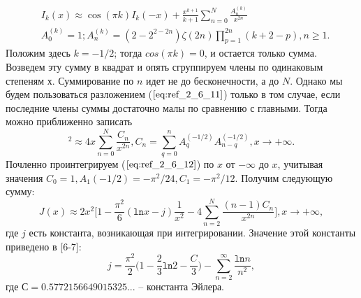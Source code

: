 \begin{equation}
\begin{aligned}
&I_k(x) \approx \cos (\pi k) I_k(-x) + \frac{x^{k+1}}{k+1} \sum\limits_{n=0}^N \frac{A_n^{(k)}}{x^{2n}} \\
&A_0^{(k)} = 1; A_n^{(k)} = (2-2^{2-2n}) \zeta(2n) \prod\limits_{p=1}^{2n} (k+2-p), n \geqslant 1.
\end{aligned}
\label{eq:ref_2_6_11}
\end{equation}
Положим здесь $k = -1/2$; тогда $cos(\pi k) = 0$, и остается только сумма. Возведем
эту сумму в квадрат и опять сгруппируем члены по одинаковым степеням $х$.
Суммирование по $n$ идет не до бесконечности, а до $N$. Однако мы будем
пользоваться разложением ($\ref{eq:ref_2_6_11}$) только в том случае, если последние члены
суммы достаточно малы по сравнению с главными. Тогда можно приближенно
записать
\begin{equation}
[I_{-1/2}(x)]^2 \approx 4x \sum\limits_{n=0}^{N} \frac{C_n}{x^{2n}}, C_n = \sum\limits_{q=0}^{n} A_q^{(-1/2)} A_{n-q}^{(-1/2)}, x \to +\infty.
\label{eq:ref_2_6_12}
\end{equation}
Почленно проинтегрируем ($\ref{eq:ref_2_6_12}$) по $x$ от $-\infty$ до $x$, учитывая значения
$C_0=1, A_1(-1/2)=-\pi^2/24, C_1=-\pi^2/12$. Получим следующую сумму:
\begin{equation}
J(x) \approx 2x^2 \Bigg[ 1 - \frac{\pi^2}{6} (\texttt{ln}x - j)\frac{1}{x^2} - 4 \sum\limits_{n=2}^{N} \frac{(n-1)C_n}{x^{2n}} \Bigg], x \to +\infty,
\label{eq:ref_2_6_13}
\end{equation}
где $j$ есть константа, возникающая при интегрировании. Значение этой
константы приведено в [6-7]:
\begin{equation}
j = \frac{\pi^2}{2} \Bigg(1 - \frac{2}{3} \texttt{ln}2 - \frac{C}{3} \Bigg) - \sum\limits_{n=2}^{\infty} \frac{\texttt{ln}n}{n^2},
\label{eq:ref_2_6_14}
\end{equation}
где $С = 0.5772156649015325...$ – константа Эйлера.

